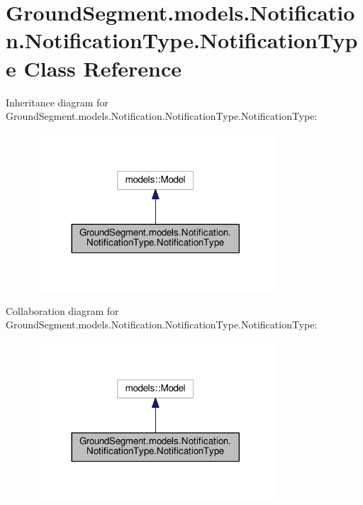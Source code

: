 \hypertarget{class_ground_segment_1_1models_1_1_notification_1_1_notification_type_1_1_notification_type}{}\section{Ground\+Segment.\+models.\+Notification.\+Notification\+Type.\+Notification\+Type Class Reference}
\label{class_ground_segment_1_1models_1_1_notification_1_1_notification_type_1_1_notification_type}


Inheritance diagram for Ground\+Segment.\+models.\+Notification.\+Notification\+Type.\+Notification\+Type\+:\nopagebreak
\begin{figure}[H]
\begin{center}
\leavevmode
\includegraphics[width=257pt]{class_ground_segment_1_1models_1_1_notification_1_1_notification_type_1_1_notification_type__inherit__graph}
\end{center}
\end{figure}


Collaboration diagram for Ground\+Segment.\+models.\+Notification.\+Notification\+Type.\+Notification\+Type\+:\nopagebreak
\begin{figure}[H]
\begin{center}
\leavevmode
\includegraphics[width=257pt]{class_ground_segment_1_1models_1_1_notification_1_1_notification_type_1_1_notification_type__coll__graph}
\end{center}
\end{figure}
